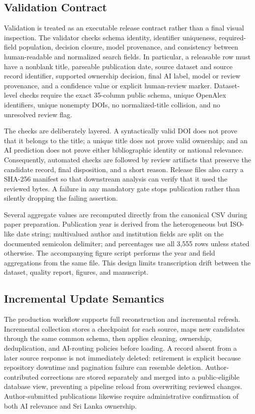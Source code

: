 \documentclass[conference]{IEEEtran}
\begin{document}
\subsection{Validation Contract}
Validation is treated as an executable release contract rather than a final visual inspection. The validator checks schema identity, identifier uniqueness, required-field population, decision closure, model provenance, and consistency between human-readable and normalized search fields. In particular, a releasable row must have a nonblank title, parseable publication date, source dataset and source record identifier, supported ownership decision, final AI label, model or review provenance, and a confidence value or explicit human-review marker. Dataset-level checks require the exact 35-column public schema, unique OpenAlex identifiers, unique nonempty DOIs, no normalized-title collision, and no unresolved review flag.

The checks are deliberately layered. A syntactically valid DOI does not prove that it belongs to the title; a unique title does not prove valid ownership; and an AI prediction does not prove either bibliographic identity or national relevance. Consequently, automated checks are followed by review artifacts that preserve the candidate record, final disposition, and a short reason. Release files also carry a SHA-256 manifest so that downstream analysis can verify that it used the reviewed bytes. A failure in any mandatory gate stops publication rather than silently dropping the failing assertion.

Several aggregate values are recomputed directly from the canonical CSV during paper preparation. Publication year is derived from the heterogeneous but ISO-like date string; multivalued author and institution fields are split on the documented semicolon delimiter; and percentages use all 3,555 rows unless stated otherwise. The accompanying figure script performs the year and field aggregations from the same file. This design limits transcription drift between the dataset, quality report, figures, and manuscript.

\subsection{Incremental Update Semantics}
The production workflow supports full reconstruction and incremental refresh. Incremental collection stores a checkpoint for each source, maps new candidates through the same common schema, then applies cleaning, ownership, deduplication, and AI-routing policies before loading. A record absent from a later source response is not immediately deleted: retirement is explicit because repository downtime and pagination failure can resemble deletion. Author-contributed corrections are stored separately and merged into a public-eligible database view, preventing a pipeline reload from overwriting reviewed changes. Author-submitted publications likewise require administrative confirmation of both AI relevance and Sri Lanka ownership.
\end{document}
